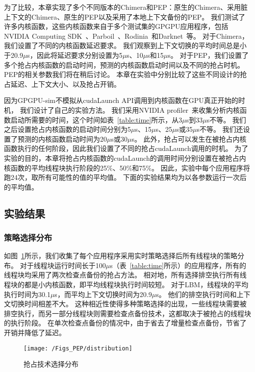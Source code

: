为了比较，本章实现了多个不同版本的Chimera和PEP：原生的Chimera、采用脏上下文的Chimera、原生的PEP以及采用了本地上下文备份的PEP。
我们测试了许多内核函数，这些内核函数来自于多个测试集的GPGPU应用程序，包括NVIDIA Computing SDK~、Parboil~、Rodinia~和Darknet~等。
对于Chimera，我们设置了不同的内核函数延迟要求。
我们观察到上下文切换的平均时间总是小于20.9$\mu$s，因此将延迟要求分别设置为5$\mu$s、10$\mu$s和15$\mu$s。
对于PEP，我们设置了多个抢占内核函数的启动时间，预测的内核函数启动时间以及不同的抢占时机。
PEP的相关参数我们将在稍后讨论。
本章在实验中分别比较了这些不同设计的抢占延迟、上下文大小、以及抢占开销。

因为GPGPU-sim不模拟从cudaLaunch API调用到内核函数在GPU真正开始的时机，
我们设计了自己的实验方法。
我们采用NVIDIA profiler~来收集分析内核函数启动所需要的时间，这个时间如表~\ref{table:time}所示，从3$\mu$s到33$\mu$s不等。
我们之后设置抢占内核函数的启动时间分别为5$\mu$s、15$\mu$s、25$\mu$s或35$\mu$s不等。
我们还设置了预测的内核函数启动时间为20$\mu$s或30$\mu$s。
此外，抢占可以发生在被抢占内核函数执行的任何阶段，因此我们设置了不同的抢占cudaLaunch调用的时机。
为了实验的目的，本章将抢占内核函数的cudaLaunch的调用时间分别设置在被抢占内核函数的平均线程块执行阶段的25\%、50\%和75\%。
因此，实验中每个应用程序将跑24次，取所有可能性的值的平均值。
下面的实验结果均为以各参数运行一次后的平均值。


\subsection{实验结果}

\subsubsection{策略选择分布}
如图~\ref{fig:distribution}所示，我们收集了每个应用程序采用实时策略选择后所有线程块的策略分布。
对于线程块运行时间长于100$\mu$s（表~\ref{table:time}所示）的应用程序，所有的线程块均采用了两次检查点备份的抢占方法。
相对地，所有选择排空执行所有线程块的都是小内核函数，即平均线程块执行时间较短。
对于LBM，线程块的平均执行时间为30.1$\mu$s，而平均上下文切换时间为20.9$\mu$s。
他们的排空执行时间和上下文切换时间相差不大。
这种相近性使得多种策略选择的出现，一些线程块需要被排空执行，而另一部分线程块则需要检查点备份技术，这都取决于被抢占的线程块的执行阶段。
在单次检查点备份的情况中，由于省去了增量检查点备份，节省了开销并降低了延迟。

\begin{figure}[htbp] %
  \centering
  \texttt{[image: /Figs\_PEP/distribution]}
  \caption{抢占技术选择分布}
  \label{fig:distribution}
\end{figure}



